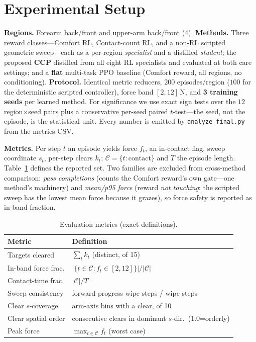 \documentclass[conference]{IEEEtran}
\begin{document}
\section{Experimental Setup}
\textbf{Regions.} Forearm back/front and upper-arm back/front (4).
\textbf{Methods.} Three reward classes---Comfort RL, Contact-count RL, and a non-RL scripted
geometric sweep---each as a per-region \emph{specialist} and a distilled \emph{student}; the
proposed \textbf{CCP} distilled from all eight RL specialists and evaluated at both care
settings; and a \textbf{flat} multi-task PPO baseline (Comfort reward, all regions, no
conditioning). \textbf{Protocol.} Identical metric reducers, $200$ episodes/region ($100$ for
the deterministic scripted controller), force band $[2,12]$\,N, and \textbf{3 training seeds}
per learned method. For significance we use exact sign tests over the $12$ region$\times$seed
pairs plus a conservative per-seed paired $t$-test---the seed, not the episode, is the
statistical unit. Every number is emitted by \texttt{analyze\_final.py} from the metrics CSV.

\textbf{Metrics.} Per step $t$ an episode yields force $f_t$, an in-contact flag,
sweep coordinate $s_t$, per-step clears $k_t$; $\mathcal{C}{=}\{t:\text{contact}\}$ and $T$ the
episode length. Table~\ref{tab:metrics} defines the reported set. Two families are excluded
from cross-method comparison: \emph{pass completions} (counts the Comfort reward's own gate---one
method's machinery) and \emph{mean/p95 force} (reward \emph{not touching}: the scripted sweep
has the lowest mean force because it grazes), so force safety is reported as in-band fraction.

\begin{table}[t]
\centering\small
\caption{Evaluation metrics (exact definitions).}
\label{tab:metrics}
\begin{tabular}{@{}p{}p{}@{}}
\toprule
\textbf{Metric} & \textbf{Definition}\\
\midrule
Targets cleared & $\sum_t k_t$ (distinct, of 15)\\
In-band force frac. & $|\{t\in\mathcal{C}:f_t\in[2,12]\}|/|\mathcal{C}|$\\
Contact-time frac. & $|\mathcal{C}|/T$\\
Sweep consistency & forward-progress wipe steps / wipe steps\\
Clear $s$-coverage & arm-axis bins with a clear, of 10\\
Clear spatial order & consecutive clears in dominant $s$-dir.\ (1.0=orderly)\\
Peak force & $\max_{t\in\mathcal{C}} f_t$ (worst case)\\
\bottomrule
\end{tabular}
\end{table}
\end{document}
